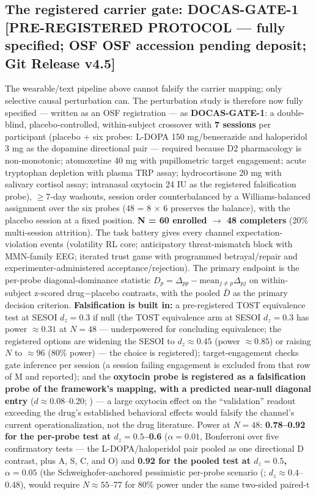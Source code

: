 \documentclass[11pt,twocolumn]{article}
\theoremstyle{plain}
\begin{document}
\subsection{The registered carrier gate: DOCAS-GATE-1 [PRE-REGISTERED PROTOCOL --- fully specified; OSF OSF accession pending deposit; Git Release v4.5]}
\label{sec:gate}

The wearable/text pipeline above cannot falsify the carrier mapping; only selective causal perturbation can. The perturbation study is therefore now fully specified --- written as an OSF registration --- as \textbf{DOCAS-GATE-1}: a double-blind, placebo-controlled, within-subject crossover with \textbf{7 sessions} per participant (placebo + six probes: L-DOPA 150 mg/benserazide and haloperidol 3 mg as the dopamine directional pair --- required because D2 pharmacology is non-monotonic; atomoxetine 40 mg with pupillometric target engagement; acute tryptophan depletion with plasma TRP assay; hydrocortisone 20 mg with salivary cortisol assay; intranasal oxytocin 24 IU as the registered falsification probe), \(\geq\)7-day washouts, session order counterbalanced by a Williams-balanced assignment over the six probes (48 = 8 \(\times\) 6 preserves the balance), with the placebo session at a fixed position. \textbf{N = 60 enrolled \(\to\) 48 completers} (20\% multi-session attrition). The task battery gives every channel expectation-violation events (volatility RL core; anticipatory threat-mismatch block with MMN-family EEG; iterated trust game with programmed betrayal/repair and experimenter-administered acceptance/rejection). The primary endpoint is the per-probe diagonal-dominance statistic \(D_p = \Delta_{pp} - \mathrm{mean}_{j \neq p}\Delta_{pj}\) on within-subject z-scored drug\(-\)placebo contrasts, with the pooled \(\bar{D}\) as the primary decision criterion. \textbf{Falsification is built in:} a pre-registered TOST equivalence test at SESOI \(d_z = 0.3\) if null (the TOST equivalence arm at SESOI \(d_z = 0.3\) has power \(\approx 0.31\) at \(N = 48\) --- underpowered for concluding equivalence; the registered options are widening the SESOI to \(d_z \approx 0.45\) (power \(\approx 0.85\)) or raising \(N\) to \(\approx 96\) (80\% power) --- the choice is registered); target-engagement checks gate inference per session (a session failing engagement is excluded from that row of M and reported); and the \textbf{oxytocin probe is registered as a falsification probe of the framework's mapping, with a predicted near-null diagonal entry} (\(d \approx 0.08\)--0.20; \citealp{nave2015,declerck2020}) --- a large oxytocin effect on the ``validation'' readout exceeding the drug's established behavioral effects would falsify the channel's current operationalization, not the drug literature. Power at \(N = 48\): \textbf{0.78--0.92 for the per-probe test at \(d_z = 0.5\)--0.6} (\(\alpha = 0.01\), Bonferroni over five confirmatory tests --- the L-DOPA/haloperidol pair pooled as one directional D contrast, plus A, S, C, and O) and \textbf{0.92 for the pooled test at \(d_z = 0.5\), \(\alpha = 0.05\)} (the Schweighofer-anchored pessimistic per-probe scenario (\citealp{schweighofer2008}; \(d_z \approx 0.4\)--0.48), would require \(N \approx 55\)--77 for 80\% power under the same two-sided paired-t 
\end{document}
